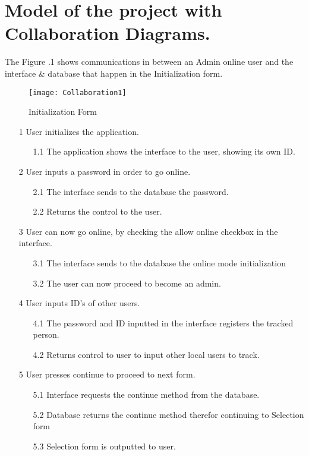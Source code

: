 
\setlength{\parindent}{2ex}
\section{Model of the project with Collaboration Diagrams.}
The Figure \thesection.1 shows communications in between an Admin online user and the interface \& database that happen in the Initialization form.
\begin{figure}[h!]
	\centering
	\texttt{[image: Collaboration1]}
	\caption{Initialization Form} 
\end{figure}
\begin{flushleft}
\begin{enumerate}
   \item[1] User initializes the application.
   \begin{itemize}
     \item[1.1] The application shows the interface to the user, showing its own ID.
   \end{itemize}
   \item[2] User inputs a password in order to go online.
   \begin{itemize}
     \item[2.1] The interface sends to the database the password.
     \item[2.2] Returns the control to the user.
   \end{itemize}
   \item[3] User can now go online, by checking the allow online checkbox in the interface.
   \begin{itemize}
     \item[3.1] The interface sends to the database the online mode initialization
     \item[3.2] The user can now proceed to become an admin.
   \end{itemize}
   \item[4] User inputs ID's of other users.
   \begin{itemize}
     \item[4.1]	The password and ID inputted in the interface registers the tracked person.
     \item[4.2] Returns control to user to input other local users to track.
   \end{itemize}
   \item[5] User presses continue to proceed to next form.
   \begin{itemize}
     \item[5.1] Interface requests the continue method from the database.
     \item[5.2] Database returns the continue method therefor continuing to Selection form
     \item[5.3] Selection form is outputted to user.
   \end{itemize}
\end{enumerate}
\end{flushleft}
